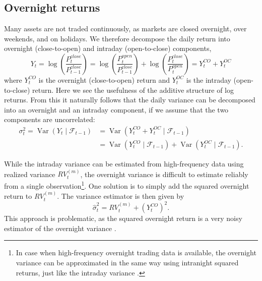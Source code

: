 \subsection{Overnight returns}
\label{sec:overnight_returns}
Many assets are not traded continuously, as markets are closed overnight, over weekends, and on holidays. We therefore decompose the daily return into overnight (close-to-open) and intraday (open-to-close) components,
\begin{equation}
    Y_t = \log\left(\frac{P_t^{close}}{P_{t-1}^{close}}\right) = \log\left(\frac{P_t^{open}}{P_{t-1}^{close}}\right) + \log\left(\frac{P_t^{close}}{P_t^{open}}\right) = Y_t^{CO} + Y_t^{OC}
\end{equation}
where $Y_t^{CO}$ is the overnight (close-to-open) return and $Y_t^{OC}$ is the intraday (open-to-close) return. Here we see the usefulness of the additive structure of log returns.
From this it naturally follows that the daily variance can be decomposed into an overnight and an intraday component, if we assume that the two components are uncorrelated:
\begin{align}
    \sigma_t^2 = \operatorname{Var}(Y_t \mid \mathcal{F}_{t-1}) &= \operatorname{Var}(Y_t^{CO} + Y_t^{OC} \mid \mathcal{F}_{t-1}) \\
    &= \operatorname{Var}(Y_t^{CO} \mid \mathcal{F}_{t-1}) + \operatorname{Var}(Y_t^{OC} \mid \mathcal{F}_{t-1}).
\end{align}

While the intraday variance can be estimated from high-frequency data using realized variance $RV_t^{(m)}$, the overnight variance is difficult to estimate reliably from a single observation\footnote{In case when high-frequency overnight trading data is available, the overnight variance can be approximated in the same way using intranight squared returns, just like the intraday variance \cite{martens2002measuring}.}.
One solution is to simply add the squared overnight return to $RV_t^{(m)}$. The variance estimator is then given by
\begin{equation}
    \hat{\sigma}_t^2 = RV_t^{(m)} + (Y_t^{CO})^2.
\end{equation}
This approach is problematic, as the squared overnight return is a very noisy estimator of the overnight variance \cite{martens2002measuring}. 


